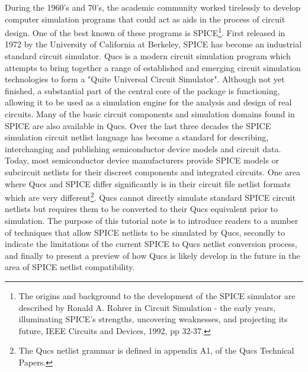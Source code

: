%
%
%
%

\renewcommand{\thesubfigure}{\thefigure(\alph{subfigure})}
\makeatletter
  \renewcommand{\@thesubfigure}{\thesubfigure:\space}
  \renewcommand{\p@subfigure}{}
\makeatother

\renewcommand{\thesubtable}{\thetable(\alph{subtable})}
\makeatletter
  \renewcommand{\@thesubtable}{\thesubtable:\space}
  \renewcommand{\p@subtable}{}
\makeatother


During the 1960's and 70's, the academic community worked tirelessly to develop computer simulation programs that could act as aids in the process of circuit design. One of the best known of these programs is SPICE\footnote{The origins and background to the development of the SPICE simulator are described by Ronald A. Rohrer in Circuit Simulation - the early years, illuminating SPICE's strengths, uncovering weaknesses, and projecting its future, IEEE Circuits and Devices, 1992, pp 32-37.}.  First released in 1972 by the University of California at Berkeley, SPICE has become an industrial standard circuit simulator. Qucs is a modern circuit simulation program which attempts to bring together a range of established and emerging circuit simulation technologies to form a "Quite Universal Circuit Simulator". Although not yet finished, a substantial part of the central core of the package is functioning, allowing it to be used as a simulation engine for the analysis and design of real circuits.   Many of the basic circuit components and simulation domains found in SPICE are also available in Qucs. Over the last three decades the SPICE simulation circuit netlist language has become a standard for describing, interchanging and publishing semiconductor device models and circuit data.  Today, most semiconductor device manufacturers provide SPICE models or subcircuit netlists for their discreet components and integrated circuits.  One area where Qucs and SPICE differ significantly is in their circuit file netlist formats which are very different\footnote{The Qucs netlist grammar is defined in appendix A1, of the Qucs Technical Papers.}.  Qucs cannot directly simulate standard SPICE circuit netlists but requires them to be converted to their Qucs equivalent prior to simulation. The purpose of this tutorial note is to introduce readers to a number of techniques that allow SPICE netlists to be simulated by Qucs, secondly to indicate the limitations of the current SPICE to Qucs netlist conversion process, and finally to present a preview of how Qucs is likely develop in the future in the area of SPICE netlist compatibility.\\







